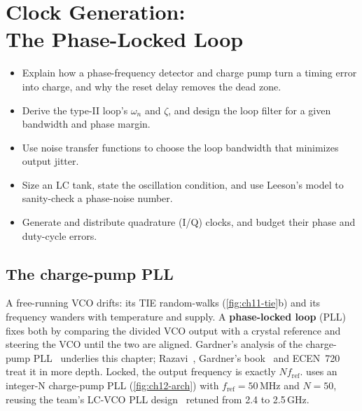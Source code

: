 \chapter[Clock Generation: The Phase-Locked Loop]{Clock Generation:\\ The Phase-Locked Loop}\label{ch:pll}

\begin{objectives}
\begin{itemize}
  \item Explain how a phase-frequency detector and charge pump turn a timing error into charge, and why the reset delay removes the dead zone.
  \item Derive the type-II loop's $\omega_n$ and $\zeta$, and design the \OS{} loop filter for a given bandwidth and phase margin.
  \item Use noise transfer functions to choose the loop bandwidth that minimizes output jitter.
  \item Size an LC tank, state the oscillation condition, and use Leeson's model to sanity-check a phase-noise number.
  \item Generate and distribute quadrature (I/Q) clocks, and budget their phase and duty-cycle errors.
\end{itemize}
\end{objectives}

\section{The charge-pump PLL}\label{sec:cppll}

A free-running VCO drifts: its TIE random-walks (\cref{fig:ch11-tie}b) and its frequency wanders with temperature and supply. A \textbf{phase-locked loop} (PLL) fixes both by comparing the divided VCO output with a crystal reference and steering the VCO until the two are aligned. Gardner's analysis of the charge-pump PLL~\cite{p5:gardner1980} underlies this chapter; Razavi~\cite{razaviPLL}, Gardner's book~\cite{gardner2005} and ECEN~720~\cite{palermo720clk} treat it in more depth. Locked, the output frequency is exactly $N f_\mathrm{ref}$. \OS{} uses an integer-N charge-pump PLL (\cref{fig:ch12-arch}) with $f_\mathrm{ref} = 50$\,MHz and $N = 50$, reusing the team's LC-VCO PLL design~\cite{smacd2026pll} retuned from 2.4 to 2.5\,GHz.

